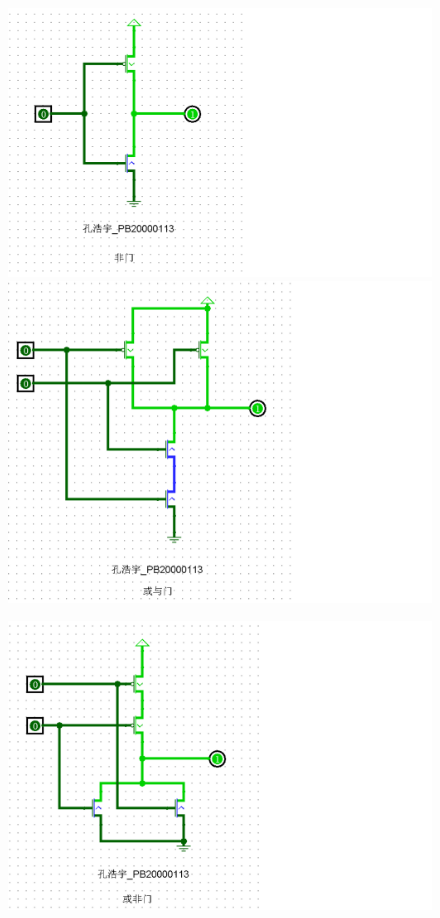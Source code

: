 \documentclass{article}
\begin{document}
		\begin{figure}[htbp]
			\centering
			\begin{minipage}{0.49\linewidth}
				\centering
				\includegraphics[scale=0.5]{1-3-3.png}
			\end{minipage}
			\begin{minipage}{0.49\linewidth}
				\centering
				\includegraphics[scale=0.5]{1-3-4.png}
			\end{minipage}
		\end{figure}
		\begin{figure}[H]
			\centering
			\includegraphics[scale=0.6]{1-3-5.png}
		\end{figure}
		\clearpage
\end{document}
